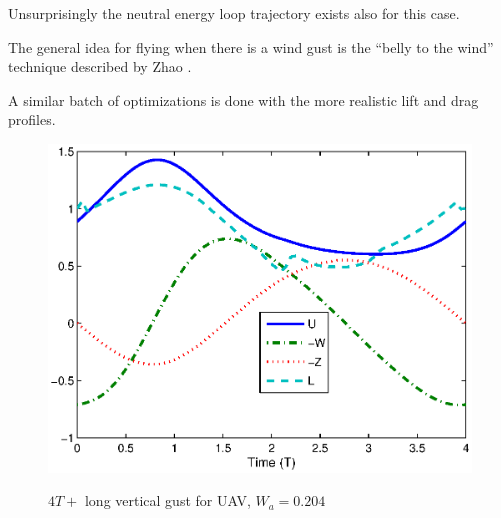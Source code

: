 Unsurprisingly the neutral energy loop trajectory exists also for this case.

\par The general idea for flying when there is a wind gust is the ``belly to the wind'' technique described by Zhao \cite{zhao2004optimal}.

\FloatBarrier

\par A similar batch of optimizations is done with the more realistic lift and drag profiles.


\begin{figure}[h]
  \begin{center}
    \scalebox{0.8}
    {\includegraphics{./Figures/Windtype=1_Tg=4_Wg=0p205_UAV_alphamax=12.eps}}
  \end{center}
  \caption{$4T+$ long vertical gust for UAV, $W_a=0.204$}
  \label{fig:vertical_optimization_UAV}
\end{figure}


